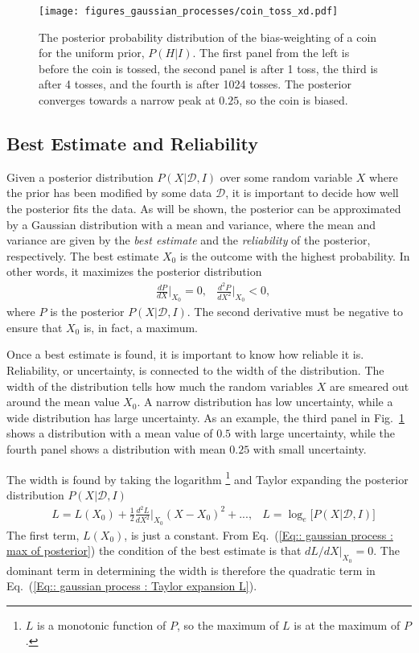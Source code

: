 \documentclass[twoside,english]{uiofysmaster}
\begin{document}
\begin{figure}
\texttt{[image: figures\_gaussian\_processes/coin\_toss\_xd.pdf]}
\caption{The posterior probability distribution of the bias-weighting of a coin for the uniform prior, $P(H|I)$. The first panel from the left is before the coin is tossed, the second panel is after 1 toss, the third is after 4 tosses, and the fourth is after 1024 tosses. The posterior converges towards a narrow peak at $0.25$, so the coin is biased.}
\label{Fig:: gaussian process : Dice throw }
\end{figure}


\subsection{Best Estimate and Reliability}\label{Sec:: gaussian process : Best estimate}

Given a posterior distribution $P(X| \mathcal{D}, I)$ over some random variable $X$ where the prior has been modified by some data $\mathcal{D}$, it is important to decide how well the posterior fits the data. As will be shown, the posterior can be approximated by a Gaussian distribution with a mean and variance, where the mean and variance are given by the \textit{best estimate} and the \textit{reliability} of the posterior, respectively. The best estimate $X_0$  is the outcome with the highest probability. In other words, it maximizes the posterior distribution
\begin{align}\label{Eq:: gaussian process : max of posterior}
&\frac{dP}{dX}\Big|_{X_0} = 0, &\frac{d^2P}{dX^2}\Big|_{X_0} < 0,
\end{align}
where $P$ is the posterior $P(X| \mathcal{D}, I)$. The second derivative must be negative to ensure that $X_0$ is, in fact, a maximum. 

Once a best estimate is found, it is important to know how reliable it is. Reliability, or uncertainty, is connected to the width of the distribution. The width of the distribution tells how much the random variables $X$ are smeared out around the mean value $X_0$. A narrow distribution has low uncertainty, while a wide distribution has large uncertainty. As an example, the third panel in Fig.~\ref{Fig:: gaussian process : Dice throw } shows a distribution with a mean value of $0.5$ with large uncertainty, while the fourth panel shows a distribution with mean $0.25$ with small uncertainty. 

The width is found by taking the logarithm \footnote{$L$ is a monotonic function of $P$, so the maximum of $L$ is at the maximum of $P$.} and Taylor expanding the posterior distribution $P(X| \mathcal{D}, I)$
\begin{align}
&L = L(X_0) + \frac{1}{2} \frac{d^2L}{dX^2}\Big|_{X_0} (X-X_0)^2 +... ,&L = \log_e \Big[P(X | \mathcal{D}, I ) \Big]\label{Eq:: gaussian process : Taylor expansion L}
\end{align}
The first term, $L(X_0)$, is just a constant. From Eq.~(\ref{Eq:: gaussian process : max of posterior}) the condition of the best estimate is that $dL/dX|_{X_0} =0$. The dominant term in determining the width is therefore the quadratic term in Eq.~(\ref{Eq:: gaussian process : Taylor expansion L}).
\end{document}
